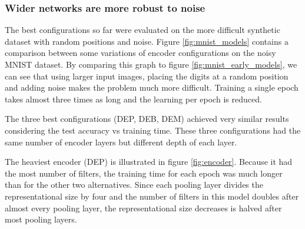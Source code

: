 
\subsubsection{Wider networks are more robust to noise}



The best configurations so far were evaluated on the more difficult synthetic dataset with random positions and noise. Figure \ref{fig:mnist_models} contains a comparison between some variations of encoder configurations on the noisy MNIST dataset.
By comparing this graph to figure \ref{fig:mnist_early_models}, we can see that using larger input images, placing the digits at a random position and adding noise makes the problem much more difficult. Training a single epoch takes almost three times as long and the learning per epoch is reduced.

The three best configurations (DEP, DEB, DEM) achieved very similar results considering the test accuracy vs training time. These three configurations had the same number of encoder layers but different depth of each layer.

The heaviest encoder (DEP) is illustrated in figure \ref{fig:encoder}.
Because it had the most number of filters, the training time for each epoch was much longer than for the other two alternatives.
Since each pooling layer divides the representational size by four and the number of filters in this model doubles after almost every pooling layer, the representational size decreases is halved after most pooling layers.

